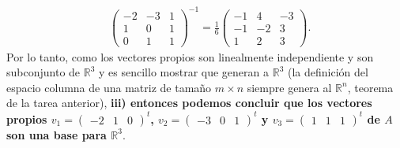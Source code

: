 \documentclass[11pt,letterpaper]{article}
\newcommand{\mR}{\mathbb{R}}
\begin{document}
\begin{enumerate}
\begin{align*}
&\begin{pmatrix}
-2 & -3 &  1\\
 1 &  0 &  1\\
 0 &  1 &  1
\end{pmatrix}^{-1}=\frac{1}{6}\begin{pmatrix}
-1 & 4 & -3 \\
-1 & -2 & 3 \\
1 & 2 & 3
\end{pmatrix}.
\end{align*}
Por lo tanto, como los vectores propios son linealmente independiente y son subconjunto de $\mR^3$ y es sencillo mostrar que generan a $\mR^3$ (la definición del espacio columna de una matriz de tamaño $m \times n$ siempre genera al $\mR^n$, teorema de la tarea anterior), \textbf{iii) entonces podemos concluir que los vectores  propios $v_1=\begin{pmatrix}
-2 & 1 &0
\end{pmatrix}^t$, $v_2= \begin{pmatrix}
-3 & 0 &1
\end{pmatrix}^t$ y $v_3= \begin{pmatrix}
1 & 1 &1
\end{pmatrix}^t$ de $A$ son una base para $\mR^3$}.\\


\end{enumerate}
\end{document}
